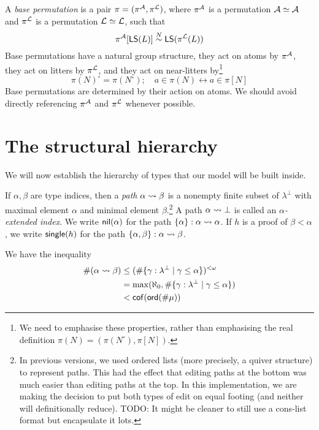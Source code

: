 \begin{definition}
  \label{def:BasePerm}
  A \emph{base permutation} is a pair \( \pi = (\pi^{\mathcal A}, \pi^{\mathcal L}) \), where \( \pi^{\mathcal A} \) is a permutation \( {\mathcal A} \simeq {\mathcal A} \) and \( \pi^{\mathcal L} \) is a permutation \( {\mathcal L} \simeq {\mathcal L} \), such that
  \[ \pi^{\mathcal A}[\operatorname{\mathsf{LS}}(L)] \mathrel{\overset{N}{\sim}} \operatorname{\mathsf{LS}}(\pi^{\mathcal L}(L)) \]
  Base permutations have a natural group structure, they act on atoms by \( \pi^{\mathcal A} \), they act on litters by \( \pi^{\mathcal L} \), and they act on near-litters by\footnote{We need to emphasise these properties, rather than emphasising the real definition \( \pi(N) = (\pi(N^\circ), \pi[N]) \).}
  \[ \pi(N)^\circ = \pi(N^\circ);\quad a \in \pi(N) \leftrightarrow a \in \pi[N] \]
  Base permutations are determined by their action on atoms.
  We should avoid directly referencing \( \pi^{\mathcal A} \) and \( \pi^{\mathcal L} \) whenever possible.
\end{definition}

\section{The structural hierarchy}

We will now establish the hierarchy of types that our model will be built inside.

\begin{definition}[path]
  \label{def:Path}
  If \( \alpha, \beta \) are type indices, then a \emph{path} \( \alpha \rightsquigarrow \beta \) is a nonempty finite subset of \( \lambda^\bot \) with maximal element \( \alpha \) and minimal element \( \beta \).\footnote{In previous versions, we used ordered lists (more precisely, a quiver structure) to represent paths. This had the effect that editing paths at the bottom was much easier than editing paths at the top. In this implementation, we are making the decision to put both types of edit on equal footing (and neither will definitionally reduce). TODO: It might be cleaner to still use a cons-list format but encapsulate it lots.}
  A path \( \alpha \rightsquigarrow \bot \) is called an \emph{\( \alpha \)-extended index}.
  We write \( \operatorname{\mathsf{nil}}(\alpha) \) for the path \( \{ \alpha \} : \alpha \rightsquigarrow \alpha \).
  If \( h \) is a proof of \( \beta < \alpha \), we write \( \operatorname{\mathsf{single}}(h) \) for the path \( \{ \alpha, \beta \} : \alpha \rightsquigarrow \beta \).

  We have the inequality
  \begin{align*}
    \#(\alpha \rightsquigarrow \beta)
    &\leq (\#\{ \gamma : \lambda^\bot \mid \gamma \leq \alpha \})^{<\omega} \\
    &= \max(\aleph_0, \#\{ \gamma : \lambda^\bot \mid \gamma \leq \alpha \}) \\
    &< \operatorname{\mathsf{cof}}(\operatorname{\mathsf{ord}}(\#\mu))
  \end{align*}
\end{definition}

